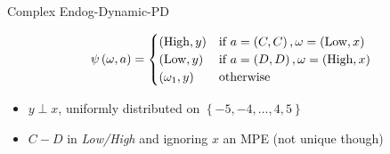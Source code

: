 \documentclass{beamer}
\begin{document}
\begin{frame}{Complex Endog-Dynamic-PD}
\begin{center}
\begin{table}
\centering{}
\end{table}
\end{center}

\[
\psi\left(\mbox{\ensuremath{\omega}},a\right)=\begin{cases}
\left(\mbox{High},y\right) & \mbox{if }a=\left(C,C\right),\omega=\left(\mbox{Low},x\right)\\
\left(\mbox{Low},y\right) & \mbox{if }a=\left(D,D\right),\omega=\left(\mbox{High},x\right)\\
\left(\omega_{1},y\right) & \mbox{otherwise}
\end{cases}
\]
\begin{itemize}
\item $y\perp x$, uniformly distributed on $\left\{ -5,-4,\ldots,4,5\right\} $
\item $C-D$ in \emph{Low/High} and ignoring $x$ an MPE (not unique though)
\end{itemize}
\end{frame}
\end{document}
